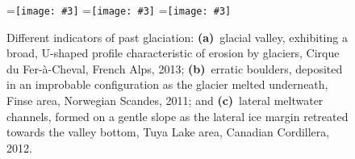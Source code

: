 \documentclass[a4paper]{kappa}
\newcommand{\subgraphics}[3][,]{%
  \setbox1=\hbox{\texttt{[image: \#3]}}%
  \leavevmode\rlap{\usebox1}%
  \rlap{\hspace*{0.25em}
        \raisebox{\dimexpr\ht1-3ex}{\textbf{(#2)}}}%
  \phantom{\usebox1}%
}
\begin{document}
\begin{figure}[b]
  \subgraphics{a}{photo-glacial-valley}%
  \hspace{1cm}%
  \subgraphics{b}{photo-erratic-boulder}%
  \hspace{1cm}%
  \subgraphics{c}{photo-melt-channels}%
  \caption{Different indicators of past glaciation:
           \textbf{(a)}~glacial valley, exhibiting a broad, U-shaped profile
           characteristic of erosion by glaciers,
           Cirque du Fer-\`{a}-Cheval, French Alps, 2013;
           \textbf{(b)}~erratic boulders, deposited in an improbable
           configuration as the glacier melted underneath,
           Finse area, Norwegian Scandes, 2011; and
           \textbf{(c)}~lateral meltwater channels, formed on a gentle slope
           as the lateral ice margin retreated towards the valley bottom, Tuya
           Lake area, Canadian Cordillera, 2012.}
  \label{fig:glaciation-indicators}
\end{figure}
\end{document}
